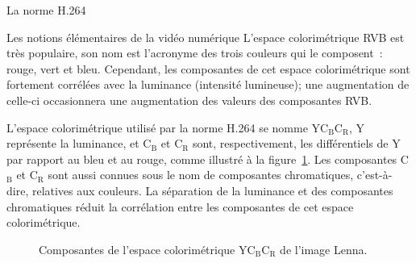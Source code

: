 \begin{chapter}{La norme H.264}
\begin{section}{Les notions élémentaires de la vidéo numérique}
L'espace colorimétrique RVB est très populaire, son nom est l'acronyme des trois
couleurs qui le composent~: rouge, vert et bleu. Cependant, les composantes de
cet espace colorimétrique sont fortement corrélées avec la luminance
(intensité lumineuse); une augmentation de celle-ci occasionnera une
augmentation des valeurs des composantes RVB.

L'espace colorimétrique utilisé par la norme H.264 se nomme
YC$_{\text{B}}$C$_{\text{R}}$, Y représente la luminance, et C$_{\text{B}}$ et
C$_{\text{R}}$ sont, respectivement, les différentiels de Y par rapport au bleu
et au rouge, comme illustré à la figure~\ref{fig-YCBCR}. Les composantes
C$_{\text{B}}$ et C$_{\text{R}}$ sont aussi connues sous le nom de composantes
chromatiques, c'est-à-dire, relatives aux couleurs. La séparation de la
luminance et des composantes chromatiques réduit la corrélation entre les
composantes de cet espace colorimétrique.

\begin{figure}
	\centering
	\caption[Composantes YC$_{\text{B}}$C$_{\text{R}}$ de l'image Lenna]
	{Composantes de l'espace colorimétrique YC$_{\text{B}}$C$_{\text{R}}$ de l'image Lenna.}
	\label{fig-YCBCR}
\end{figure}


\end{section}
\end{chapter}
